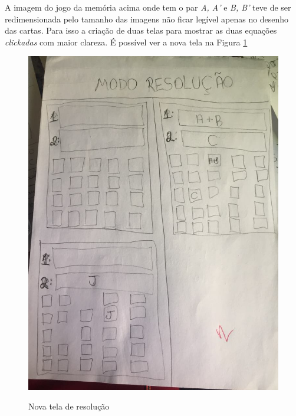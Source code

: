 A imagem do jogo da memória acima onde tem o par \textit{A, A'} e \textit{B, B'} teve de ser redimensionada pelo tamanho das imagens não ficar legível apenas no desenho das cartas. Para isso a criação de duas telas para mostrar as duas equações \textit{clickadas} com maior clareza. É possível ver a nova tela na Figura \ref{prot3}

\begin{figure}[H]
\centering
\caption{Nova tela de resolução}
\includegraphics[scale=0.27]{figuras/prot3.jpg}
\label{prot3}
\end{figure}


